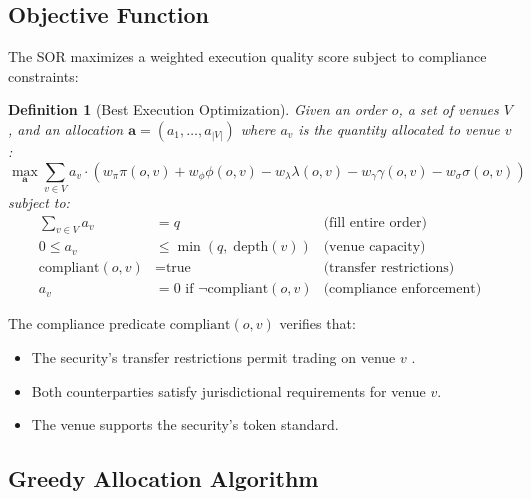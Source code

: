 \documentclass[11pt,a4paper]{article}
\newtheorem{definition}{Definition}
\begin{document}
\subsection{Objective Function}

The SOR maximizes a weighted execution quality score subject to compliance constraints:

\begin{definition}[Best Execution Optimization]
Given an order $o$, a set of venues $V$, and an allocation $\mathbf{a} = (a_1, \ldots, a_{|V|})$ where $a_v$ is the quantity allocated to venue $v$:
\[
\max_{\mathbf{a}} \sum_{v \in V} a_v \cdot \left( w_\pi \pi(o,v) + w_\phi \phi(o,v) - w_\lambda \lambda(o,v) - w_\gamma \gamma(o,v) - w_\sigma \sigma(o,v) \right)
\]
subject to:
\begin{align}
\sum_{v \in V} a_v &= q & \text{(fill entire order)} \\
0 \leq a_v &\leq \min(q,\; \text{depth}(v)) & \text{(venue capacity)} \\
\text{compliant}(o, v) &= \text{true} & \text{(transfer restrictions)} \\
a_v &= 0 \text{ if } \lnot\text{compliant}(o, v) & \text{(compliance enforcement)}
\end{align}
\end{definition}

The compliance predicate $\text{compliant}(o, v)$ verifies that:
\begin{itemize}[nosep]
  \item The security's transfer restrictions permit trading on venue $v$ \cite{lux-security-token-standard}.
  \item Both counterparties satisfy jurisdictional requirements for venue $v$.
  \item The venue supports the security's token standard.
\end{itemize}

\subsection{Greedy Allocation Algorithm}
\end{document}
